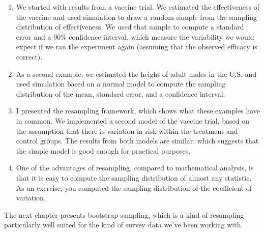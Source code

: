 \begin{enumerate}
\def\labelenumi{\arabic{enumi}.}
\item
  We started with results from a vaccine trial. We estimated the
  effectiveness of the vaccine and used simulation to draw a random
  sample from the sampling distribution of effectiveness. We used that
  sample to compute a standard error and a 90\% confidence interval,
  which measure the variability we would expect if we ran the experiment
  again (assuming that the observed efficacy is correct).
\item
  As a second example, we estimated the height of adult males in the
  U.S. and used simulation based on a normal model to compute the
  sampling distribution of the mean, standard error, and a confidence
  interval.
\item
  I presented the resampling framework, which shows what these examples
  have in common. We implemented a second model of the vaccine trial,
  based on the assumption that there is variation in risk within the
  treatment and control groups. The results from both models are
  similar, which suggests that the simple model is good enough for
  practical purposes.
\item
  One of the advantages of resampling, compared to mathematical
  analysis, is that it is easy to compute the sampling distribution of
  almost any statistic. As an exercise, you computed the sampling
  distribution of the coefficient of variation.
\end{enumerate}

The next chapter presents bootstrap sampling, which is a kind of
resampling particularly well suited for the kind of survey data we've
been working with.

